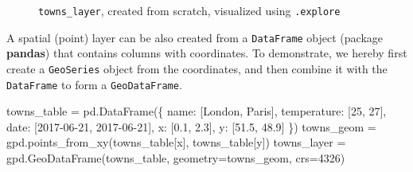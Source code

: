 \documentclass[
  letterpaper,
]{krantz}
\newenvironment{Shaded}{\begin{snugshade}}{\end{snugshade}}
\newcommand{\DecValTok}[1]{\textcolor[rgb]{0.68,0.00,0.00}{#1}}
\newcommand{\FloatTok}[1]{\textcolor[rgb]{0.68,0.00,0.00}{#1}}
\newcommand{\NormalTok}[1]{\textcolor[rgb]{0.00,0.23,0.31}{#1}}
\newcommand{\OperatorTok}[1]{\textcolor[rgb]{0.37,0.37,0.37}{#1}}
\newcommand{\StringTok}[1]{\textcolor[rgb]{0.13,0.47,0.30}{#1}}
\begin{document}
\begin{figure}


\caption{\label{fig-layer-from-scratch-explore}\texttt{towns\_layer},
created from scratch, visualized using \texttt{.explore}}

\end{figure}%

A spatial (point) layer can be also created from a \texttt{DataFrame}
object (package \textbf{pandas}) that contains columns with coordinates.
To demonstrate, we hereby first create a \texttt{GeoSeries} object from
the coordinates, and then combine it with the \texttt{DataFrame} to form
a \texttt{GeoDataFrame}.

\begin{Shaded}
\begin{Highlighting}[]
\NormalTok{towns\_table }\OperatorTok{=}\NormalTok{ pd.DataFrame(\{}
  \StringTok{\textquotesingle{}name\textquotesingle{}}\NormalTok{: [}\StringTok{\textquotesingle{}London\textquotesingle{}}\NormalTok{, }\StringTok{\textquotesingle{}Paris\textquotesingle{}}\NormalTok{],}
  \StringTok{\textquotesingle{}temperature\textquotesingle{}}\NormalTok{: [}\DecValTok{25}\NormalTok{, }\DecValTok{27}\NormalTok{],}
  \StringTok{\textquotesingle{}date\textquotesingle{}}\NormalTok{: [}\StringTok{\textquotesingle{}2017{-}06{-}21\textquotesingle{}}\NormalTok{, }\StringTok{\textquotesingle{}2017{-}06{-}21\textquotesingle{}}\NormalTok{],}
  \StringTok{\textquotesingle{}x\textquotesingle{}}\NormalTok{: [}\FloatTok{0.1}\NormalTok{, }\FloatTok{2.3}\NormalTok{],}
  \StringTok{\textquotesingle{}y\textquotesingle{}}\NormalTok{: [}\FloatTok{51.5}\NormalTok{, }\FloatTok{48.9}\NormalTok{]}
\NormalTok{\})}
\NormalTok{towns\_geom }\OperatorTok{=}\NormalTok{ gpd.points\_from\_xy(towns\_table[}\StringTok{\textquotesingle{}x\textquotesingle{}}\NormalTok{], towns\_table[}\StringTok{\textquotesingle{}y\textquotesingle{}}\NormalTok{])}
\NormalTok{towns\_layer }\OperatorTok{=}\NormalTok{ gpd.GeoDataFrame(towns\_table, geometry}\OperatorTok{=}\NormalTok{towns\_geom, crs}\OperatorTok{=}\DecValTok{4326}\NormalTok{)}
\end{Highlighting}
\end{Shaded}
\end{document}

